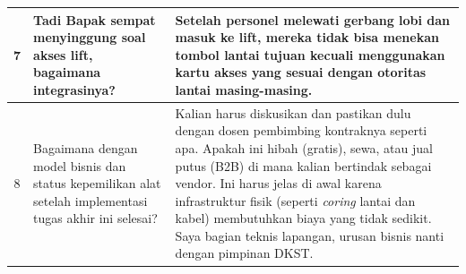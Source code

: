 \begin{longtable}{|c|p{}|p{}|}
7 & Tadi Bapak sempat menyinggung soal akses lift, bagaimana integrasinya? & Setelah personel melewati gerbang lobi dan masuk ke lift, mereka tidak bisa menekan tombol lantai tujuan kecuali menggunakan kartu akses yang sesuai dengan otoritas lantai masing-masing. \\ \hline
8 & Bagaimana dengan model bisnis dan status kepemilikan alat setelah implementasi tugas akhir ini selesai? & Kalian harus diskusikan dan pastikan dulu dengan dosen pembimbing kontraknya seperti apa. Apakah ini hibah (gratis), sewa, atau jual putus (B2B) di mana kalian bertindak sebagai vendor. Ini harus jelas di awal karena infrastruktur fisik (seperti \textit{coring} lantai dan kabel) membutuhkan biaya yang tidak sedikit. Saya bagian teknis lapangan, urusan bisnis nanti dengan pimpinan DKST. \\ \hline
\end{longtable}
